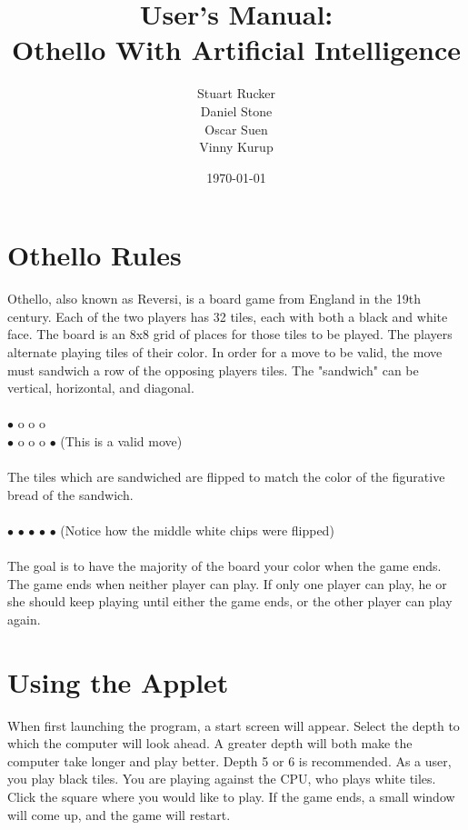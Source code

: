 \documentclass[12pt]{article}
\title{User's Manual: \\ Othello With Artificial Intelligence}
\author{Stuart Rucker \\ Daniel Stone \\ Oscar Suen\\ Vinny Kurup}
\date{\today}
\begin{document}
\maketitle

\section{Othello Rules}
Othello, also known as Reversi, is a board game from England in the 19th century.  Each of the two players has 32 tiles, each with both a black and white face. The board is an 8x8 grid of places for those tiles to be played. The players alternate playing tiles of their color. In order for a move to be valid, the move must sandwich a row of the opposing players tiles. The "sandwich" can be vertical, horizontal, and diagonal.\\\\
$\bullet$ o o o\\
$\bullet$ o o o $\bullet$ (This is a valid move)\\\\
The tiles which are sandwiched are flipped to match the color of the figurative bread of the sandwich.\\\\
$\bullet$ $\bullet$ $\bullet$ $\bullet$ $\bullet$ (Notice how the middle white chips were flipped)\\\\
 The goal is to have the majority of the board your color when the game ends. The game ends when neither player can play. If only one player can play, he or she should keep playing until either the game ends, or the other player can play again. 
\section{Using the Applet}
When first launching the program, a start screen will appear. Select the depth to which the computer will look ahead. A greater depth will both make the computer take longer and play better. Depth 5 or 6 is recommended. As a user, you play black tiles. You are playing against the CPU, who plays white tiles. Click the square where you would like to play. If the game ends, a small window will come up, and the game will restart.
\end{document}
